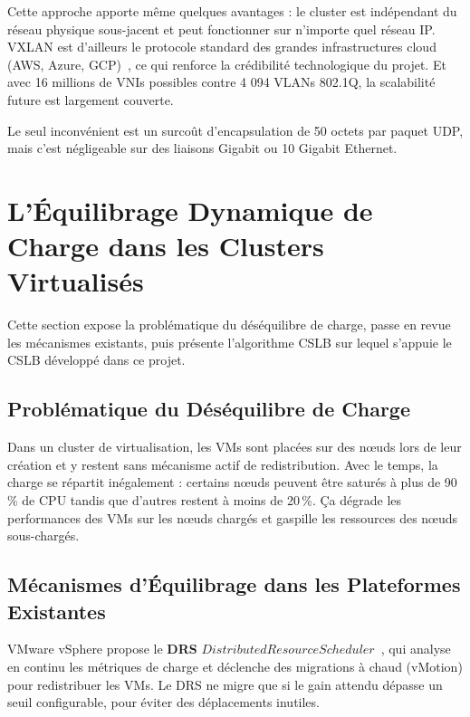 \par Cette approche apporte même quelques avantages : le cluster est indépendant du réseau physique sous-jacent et peut fonctionner sur n'importe quel réseau IP. VXLAN est d'ailleurs le protocole standard des grandes infrastructures cloud (AWS, Azure, GCP)~\cite{refVXLAN}, ce qui renforce la crédibilité technologique du projet. Et avec 16 millions de VNIs possibles contre 4 094 VLANs 802.1Q, la scalabilité future est largement couverte.\\

\par Le seul inconvénient est un surcoût d'encapsulation de 50 octets par paquet UDP, mais c'est négligeable sur des liaisons Gigabit ou 10 Gigabit Ethernet.\\

\section{L'Équilibrage Dynamique de Charge dans les Clusters Virtualisés}

\par Cette section expose la problématique du déséquilibre de charge, passe en revue les mécanismes existants, puis présente l'algorithme CSLB sur lequel s'appuie le CSLB développé dans ce projet.\\

\subsection{Problématique du Déséquilibre de Charge}

\par Dans un cluster de virtualisation, les VMs sont placées sur des n\oe{}uds lors de leur création et y restent sans mécanisme actif de redistribution. Avec le temps, la charge se répartit inégalement : certains n\oe{}uds peuvent être saturés à plus de 90\,\% de CPU tandis que d'autres restent à moins de 20\,\%. Ça dégrade les performances des VMs sur les n\oe{}uds chargés et gaspille les ressources des n\oe{}uds sous-chargés.

\subsection{Mécanismes d'Équilibrage dans les Plateformes Existantes}

\par VMware vSphere propose le \textbf{DRS} \(Distributed Resource Scheduler\)~\cite{ref21}, qui analyse en continu les métriques de charge et déclenche des migrations à chaud (vMotion) pour redistribuer les VMs. Le DRS ne migre que si le gain attendu dépasse un seuil configurable, pour éviter des déplacements inutiles. \\

